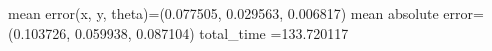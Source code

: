 mean error(x, y, theta)=(0.077505, 0.029563, 0.006817)
mean absolute error=(0.103726, 0.059938, 0.087104)
total_time =133.720117